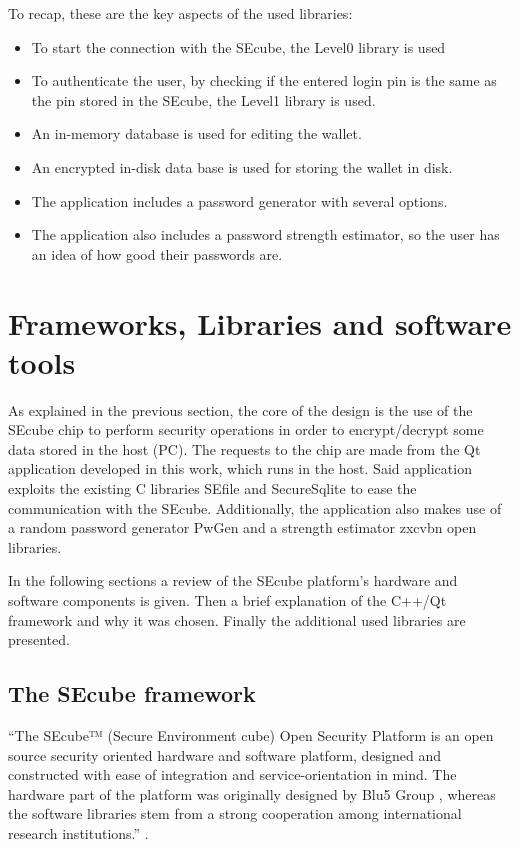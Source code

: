\vskip 25pt

To recap, these are the key aspects of the used libraries:

\begin{itemize}
\setlength\itemsep{0pt}
\item To start the connection with the SEcube, the Level0 library is used
\item To authenticate the user, by checking if the entered login pin is the same as the pin stored in the SEcube, the Level1 library is used.
\item An in-memory database is used for editing the wallet.
\item An encrypted in-disk data base is used for storing the wallet in disk.
\item The application includes a password generator with several options.
\item The application also includes a password strength estimator, so the user has an idea of how good their passwords are.

\end{itemize}

\section{Frameworks, Libraries and software tools} \label{sec:lib}

As explained in the previous section, the core of the design is the use of the SEcube chip to perform security operations in order to encrypt/decrypt some data stored in the host (PC). The requests to the chip are made from the Qt application developed in this work, which runs in the host. Said application exploits the existing C libraries SEfile and SecureSqlite to ease the communication with the SEcube. Additionally, the application also makes use of a random password generator PwGen and a strength estimator zxcvbn open libraries. 

In the following sections a review of the SEcube platform's hardware and software components is given. Then a brief explanation of the C++/Qt framework and why it was chosen. Finally the additional used libraries are presented.

\subsection{The SEcube framework}

``The SEcube™ (Secure Environment cube) Open Security Platform is an open source security oriented hardware and software platform, designed and constructed with ease of integration and service-orientation in mind. The hardware part of the platform was originally designed by Blu5 Group \cite{Blu5}, whereas the software libraries stem from a strong cooperation among international research institutions.'' \cite{GetStart}.

